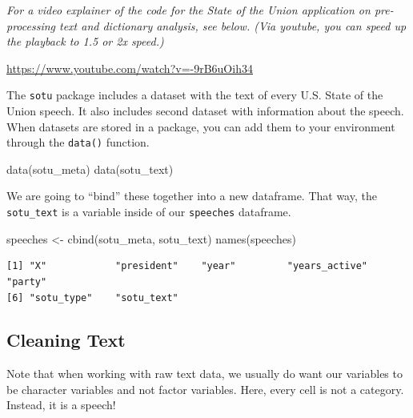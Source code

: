 \documentclass[
  letterpaper,
  DIV=11,
  numbers=noendperiod]{scrreprt}
\newenvironment{Shaded}{\begin{snugshade}}{\end{snugshade}}
\newcommand{\FunctionTok}[1]{\textcolor[rgb]{0.28,0.35,0.67}{#1}}
\newcommand{\NormalTok}[1]{\textcolor[rgb]{0.00,0.23,0.31}{#1}}
\newcommand{\OtherTok}[1]{\textcolor[rgb]{0.00,0.23,0.31}{#1}}
\newcommand{\SpecialCharTok}[1]{\textcolor[rgb]{0.37,0.37,0.37}{#1}}
\begin{document}
\emph{For a video explainer of the code for the State of the Union
application on pre-processing text and dictionary analysis, see below.
(Via youtube, you can speed up the playback to 1.5 or 2x speed.)}

\url{https://www.youtube.com/watch?v=-9rB6uOih34}

The \texttt{sotu} package includes a dataset with the text of every U.S.
State of the Union speech. It also includes second dataset with
information about the speech. When datasets are stored in a package, you
can add them to your environment through the \texttt{data()} function.

\begin{Shaded}
\begin{Highlighting}[]
\FunctionTok{data}\NormalTok{(sotu\_meta)}
\FunctionTok{data}\NormalTok{(sotu\_text)}
\end{Highlighting}
\end{Shaded}

We are going to ``bind'' these together into a new dataframe. That way,
the \texttt{sotu\_text} is a variable inside of our \texttt{speeches}
dataframe.

\begin{Shaded}
\begin{Highlighting}[]
\NormalTok{speeches }\OtherTok{\textless{}{-}} \FunctionTok{cbind}\NormalTok{(sotu\_meta, sotu\_text)}
\FunctionTok{names}\NormalTok{(speeches)}
\end{Highlighting}
\end{Shaded}

\begin{verbatim}
[1] "X"            "president"    "year"         "years_active" "party"       
[6] "sotu_type"    "sotu_text"   
\end{verbatim}

\hypertarget{cleaning-text}{%
\subsection{Cleaning Text}\label{cleaning-text}}

Note that when working with raw text data, we usually do want our
variables to be character variables and not factor variables. Here,
every cell is not a category. Instead, it is a speech!

\begin{Shaded}
\end{Shaded}
\end{document}
